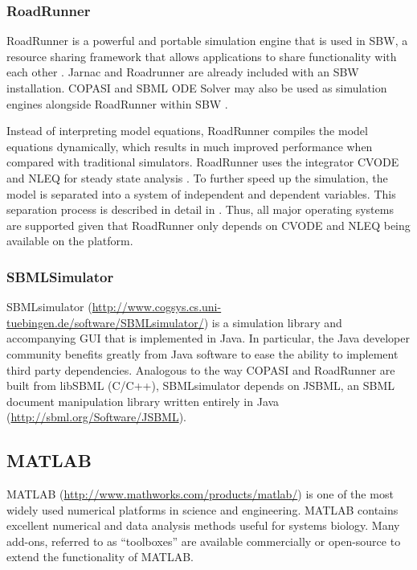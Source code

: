 \documentclass[]{article}
\begin{document}
\subsubsection{RoadRunner}

RoadRunner is a powerful and portable simulation engine that is used in
SBW, a resource sharing framework that allows applications to share
functionality with each other \autocite{bergmann2006sbw}. Jarnac and
Roadrunner are already included with an SBW installation. COPASI and
SBML ODE Solver may also be used as simulation engines alongside
RoadRunner within SBW \autocite{bergmann2008comparing}.

Instead of interpreting model equations, RoadRunner compiles the model
equations dynamically, which results in much improved performance when
compared with traditional simulators. RoadRunner uses the integrator
CVODE and NLEQ for steady state analysis \autocite{cohen1996cvode}. To
further speed up the simulation, the model is separated into a system of
independent and dependent variables. This separation process is
described in detail in \autocite{vallabhajosyula2006conservation}. Thus,
all major operating systems are supported given that RoadRunner only
depends on CVODE and NLEQ being available on the platform.

\subsubsection{SBMLSimulator}

SBMLsimulator
(\url{http://www.cogsys.cs.uni-tuebingen.de/software/SBMLsimulator/})
\autocite{drager2011jsbml} is a simulation library and accompanying GUI
that is implemented in Java. In particular, the Java developer community
benefits greatly from Java software to ease the ability to implement
third party dependencies. Analogous to the way COPASI and RoadRunner are
built from libSBML (C/C++), SBMLsimulator depends on JSBML, an SBML
document manipulation library written entirely in Java
(\url{http://sbml.org/Software/JSBML}).

\subsection{MATLAB}

MATLAB (\url{http://www.mathworks.com/products/matlab/}) is one of the
most widely used numerical platforms in science and engineering. MATLAB
contains excellent numerical and data analysis methods useful for
systems biology. Many add-ons, referred to as ``toolboxes'' are
available commercially or open-source to extend the functionality of
MATLAB.
\end{document}
